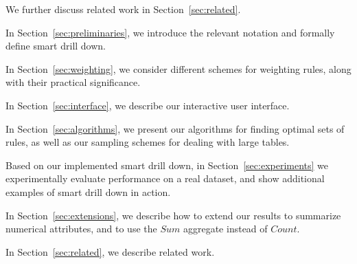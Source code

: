 We further discuss related work in Section~\ref{sec:related}.

\squishlist 

\item In Section~\ref{sec:preliminaries}, we introduce the relevant
notation and formally define smart drill down.

\item In Section~\ref{sec:weighting}, we consider different schemes
for weighting rules, along with their practical significance.

\item In Section~\ref{sec:interface}, we describe our
interactive user interface. 
  
\item In Section~\ref{sec:algorithms}, we present our algorithms for
finding optimal sets of rules, as well as our sampling schemes
for dealing with large tables.

\item Based on our implemented smart drill down,
in Section~\ref{sec:experiments} we experimentally evaluate
performance on a real dataset,
and show additional examples of smart drill down in action.

\item In Section~\ref{sec:extensions}, we describe how to extend our results to summarize numerical attributes, and to use the $Sum$ aggregate instead of $Count$.

\item In Section~\ref{sec:related}, we describe related work.
\squishend 
